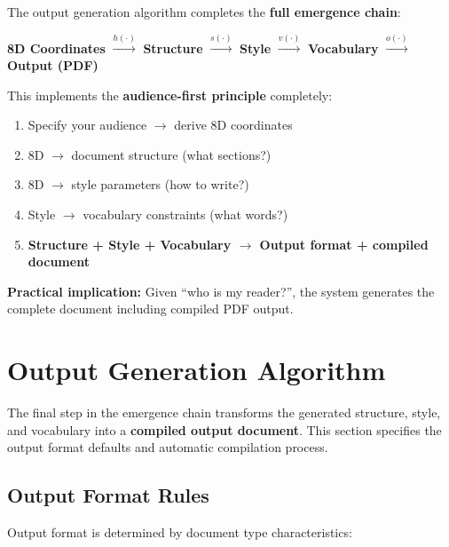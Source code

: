 \begin{tcolorbox}[colback=yellow!5!white, colframe=yellow!75!black,
    title=Key Insight: Complete Emergence Chain]

The output generation algorithm completes the \textbf{full emergence chain}:

\begin{center}
\textbf{8D Coordinates} $\xrightarrow{h(\cdot)}$ \textbf{Structure} $\xrightarrow{s(\cdot)}$ \textbf{Style} $\xrightarrow{v(\cdot)}$ \textbf{Vocabulary} $\xrightarrow{o(\cdot)}$ \textbf{Output (PDF)}
\end{center}

This implements the \textbf{audience-first principle} completely:
\begin{enumerate}[nosep]
\item Specify your audience $\to$ derive 8D coordinates
\item 8D $\to$ document structure (what sections?)
\item 8D $\to$ style parameters (how to write?)
\item Style $\to$ vocabulary constraints (what words?)
\item \textbf{Structure + Style + Vocabulary $\to$ Output format + compiled document}
\end{enumerate}

\textbf{Practical implication:} Given ``who is my reader?'', the system generates
the complete document including compiled PDF output.

\end{tcolorbox}


\section{Output Generation Algorithm}
\label{sec:doctype-output}

The final step in the emergence chain transforms the generated structure, style,
and vocabulary into a \textbf{compiled output document}. This section specifies
the output format defaults and automatic compilation process.

\subsection{Output Format Rules}

Output format is determined by document type characteristics:

